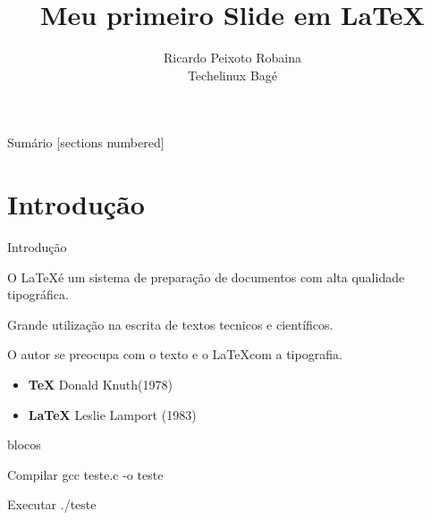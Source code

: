 \documentclass{beamer}
\title{Meu primeiro Slide em \LaTeX}
\author{Ricardo Peixoto Robaina \\ Techelinux Bagé}
\institute{Universidade Federal do Pampa}
\begin{document}
	
	\begin{frame}[noframenumbering]
		\titlepage
		\thispagestyle{empty}
	\end{frame}
	
	\begin{frame}{Sumário}
		[sections numbered]
		\tableofcontents[hideallsubsections]
	\end{frame}

\section{Introdução}
\begin{frame}{Introdução}
	
	
	O \LaTeX é um sistema de preparação de documentos com alta qualidade tipográfica.

	
	Grande utilização na escrita de textos tecnicos e científicos.
	
	
	O autor se preocupa com o texto e o \LaTeX com a tipografia.
	
	\pause
	
	\begin{itemize}
		\item \textbf{TeX} Donald Knuth(1978)  
		\item \textbf{\LaTeX} Leslie Lamport (1983)
	\end{itemize}

\end{frame}

	\begin{frame}{blocos}
		\begin{block}{Compilar}
			gcc teste.c -o teste
		\end{block}
	
		\begin{block}{Executar}
			./teste
		\end{block}
	\end{frame}
\end{document}
